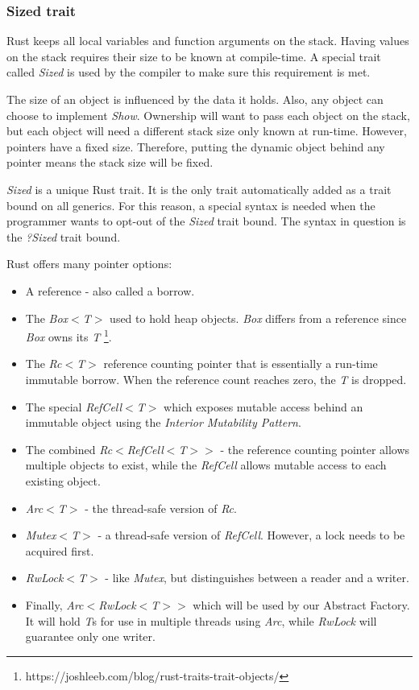 \documentclass[a4paper,10pt]{article}
\begin{document}
\subsubsection{Sized trait}
Rust keeps all local variables and function arguments on the stack.
Having values on the stack requires their size to be known at compile-time.
A special trait called \textit{Sized} is used by the compiler to make sure this requirement is met. \cite{klabnik_2019_01}

The size of an object is influenced by the data it holds.
Also, any object can choose to implement \textit{Show}.
Ownership will want to pass each object on the stack, but each object will need a different stack size only known at run-time.
However, pointers have a fixed size.
Therefore, putting the dynamic object behind any pointer means the stack size will be fixed.

\begin{notebox}
  \textit{Sized} is a unique Rust trait.
  It is the only trait automatically added as a trait bound on all generics.
  For this reason, a special syntax is needed when the programmer wants to opt-out of the \textit{Sized} trait bound.
  The syntax in question is the \textit{?Sized} trait bound. \cite{klabnik_2019_01}
\end{notebox}

Rust offers many pointer options: \cite{klabnik_2019_01}
\begin{itemize}
  \item A reference - also called a borrow.
  \item The \textit{Box$<$T$>$} used to hold heap objects.
        \textit{Box} differs from a reference since \textit{Box} owns its \textit{T} \footnote{https://joshleeb.com/blog/rust-traits-trait-objects/}.
  \item The \textit{Rc$<$T$>$} reference counting pointer that is essentially a run-time immutable borrow.
        When the reference count reaches zero, the \textit{T} is dropped.
  \item The special \textit{RefCell$<$T$>$} which exposes mutable access behind an immutable object using the \textit{Interior Mutability Pattern}.
  \item The combined \textit{Rc$<$RefCell$<$T$>$$>$} - the reference counting pointer allows multiple objects to exist, while the \textit{RefCell} allows mutable access to each existing object.
  \item \textit{Arc$<$T$>$} - the thread-safe version of \textit{Rc}.
  \item \textit{Mutex$<$T$>$} - a thread-safe version of \textit{RefCell}.
        However, a lock needs to be acquired first.
  \item \textit{RwLock$<$T$>$} - like \textit{Mutex}, but distinguishes between a reader and a writer.
  \item Finally, \textit{Arc$<$RwLock$<$T$>$$>$} which will be used by our Abstract Factory.
        It will hold \textit{T}s for use in multiple threads using \textit{Arc}, while \textit{RwLock} will guarantee only one writer.
\end{itemize}
\end{document}
